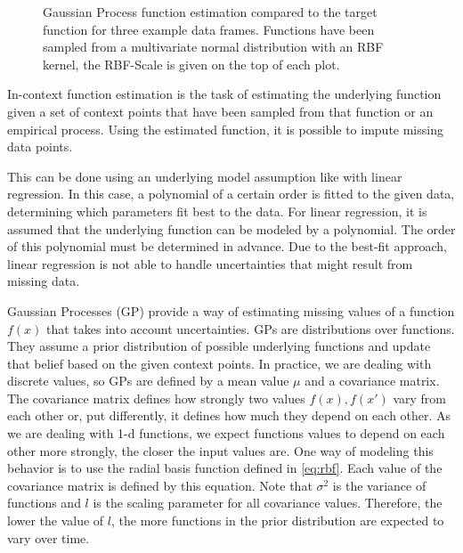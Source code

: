 \begin{figure*}
	\centering
	\resizebox{0.90\textwidth}{!}{
		
		
		
	}
	\caption{Gaussian Process function estimation compared to the target function for three example data frames. Functions have been sampled from a multivariate normal distribution with an RBF kernel, the RBF-Scale is given on the top of each plot. }
	\label{fig:gaussian}
\end{figure*}

In-context function estimation is the task of estimating the underlying function given a set of context points that have been sampled from that function or an empirical process. Using the estimated function, it is possible to impute missing data points. \cite{seifner2025zeroshotimputationfoundationinference}

This can be done using an underlying model assumption like with linear regression. In this case, a polynomial of a certain order is fitted to the given data, determining which parameters fit best to the data. For linear regression, it is assumed that the underlying function can be modeled by a polynomial. The order of this polynomial must be determined in advance. Due to the best-fit approach, linear regression is not able to handle uncertainties that might result from missing data.

Gaussian Processes (GP) provide a way of estimating missing values of a function $f(x)$ that takes into account uncertainties. GPs are distributions over functions. They assume a prior distribution of possible underlying functions and update that belief based on the given context points. In practice, we are dealing with discrete values, so GPs are defined by a mean value $\mu$ and a covariance matrix. The covariance matrix defines how strongly two values $f(x),f(x')$ vary from each other or, put differently, it defines how much they depend on each other. As we are dealing with 1-d functions, we expect functions values to depend on each other more strongly, the closer the input values are. One way of modeling this behavior is to use the radial basis function defined in \autoref{eq:rbf}. Each value of the covariance matrix is defined by this equation. Note that $\sigma^2$ is the variance of functions and $l$ is the scaling parameter for all covariance values. Therefore, the lower the value of $l$, the more functions in the prior distribution are expected to vary over time. \cite{garnelo2018neural, williams2006gaussian}

